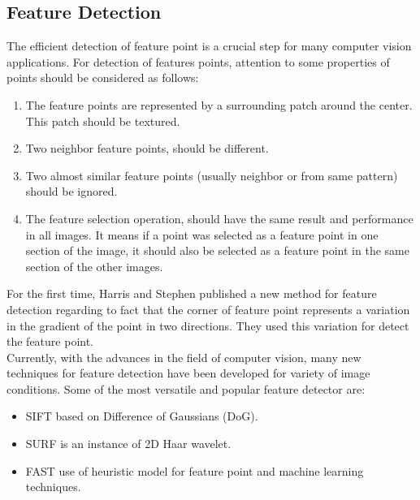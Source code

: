 \subsection{Feature Detection}
 The efficient detection of feature point is a crucial step for many computer vision applications. For detection of features points, attention to some properties of points should be considered as follows: \cite{forstner1986feature}
\begin{enumerate}
  \item The feature points are represented by a surrounding patch around the center. This patch should be textured.
  \item Two neighbor feature points, should be different.
  \item Two almost similar feature points (usually neighbor or from same pattern) should be ignored.
  \item The feature selection operation, should have the same result and performance in all images. It means if a point was selected as a feature point in one section of the image, it should also be selected as a feature point in the same section of the other images.
\end{enumerate}
For the first time, Harris and Stephen \cite{harris1988combined} published a new method for feature detection regarding to fact that the corner of feature point represents a variation in the gradient of the point in two directions. They used this variation for detect the feature point.\\
Currently, with the advances in the field of computer vision, many new techniques for feature detection have been developed for variety of image conditions. Some of the most versatile and popular feature detector are:
\begin{itemize}
\item SIFT \cite{lowe2004distinctive} based on Difference of Gaussians (DoG).
\item SURF \cite{bay2006surf} is an instance of 2D Haar wavelet.
\item FAST \cite{rosten2010faster} use of heuristic model for feature point and machine learning techniques.
\end{itemize}

